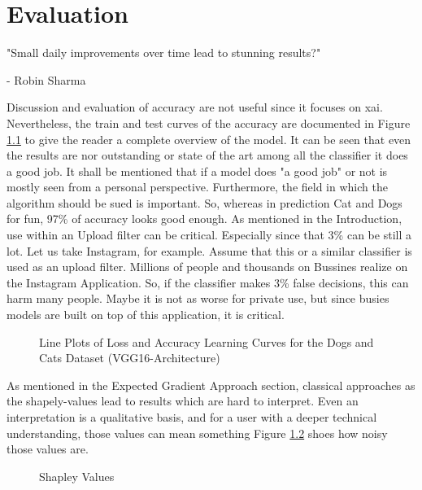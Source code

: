 
\chapter{Evaluation}
\label{ch:summary}
\epigraph{"Small daily improvements over time lead to stunning results?"}{- Robin Sharma}

Discussion and evaluation of accuracy are not useful since it focuses on \gls{xai}. Nevertheless, the train and test curves of the accuracy are documented in Figure \ref{fig:leaning_courves} to give the reader a complete overview of the model. It can be seen that even the results are nor outstanding or state of the art among all the classifier it does a good job. It shall be mentioned that if a model does "a good job" or not is mostly seen from a personal perspective. Furthermore, the field in which the algorithm should be sued is important. So, whereas in prediction Cat and Dogs for fun, 97\% of accuracy looks good enough. As mentioned in the Introduction, use within an Upload filter can be critical. Especially since that 3\% can be still a lot. Let us take Instagram, for example. Assume that this or a similar classifier is used as an upload filter. Millions of people and thousands on Bussines realize on the Instagram Application. So, if the classifier makes 3\% false decisions, this can harm many people. Maybe it is not as worse for private use, but since busies models are built on top of this application, it is critical.

\begin{figure}[htp]
	\centering
	\caption{Line Plots of Loss and Accuracy Learning Curves for the Dogs and Cats Dataset (VGG16-Architecture)}
	\label{fig:leaning_courves}
\end{figure}

As mentioned in the Expected Gradient Approach section, classical approaches as the shapely-values lead to results which are hard to interpret. Even an interpretation is a qualitative basis, and for a user with a deeper technical understanding, those values can mean something Figure \ref{fig:shapley_values_on_dogs} shoes how noisy those values are. 

\begin{figure}[htp]
	\centering
	\caption{Shapley Values }
	\label{fig:shapley_values_on_dogs}
\end{figure}

